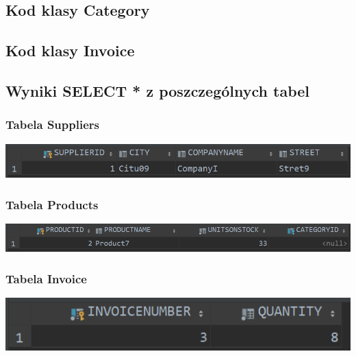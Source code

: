\documentclass[a4paper, 11pt]{article}
\begin{document}
    \newpage

    \subsection{Kod klasy Category}
    

    \newpage

    \subsection{Kod klasy Invoice}
    

    \newpage

    \subsection{Wyniki SELECT * z poszczególnych tabel}

    \subsubsection{Tabela Suppliers}
    \begin{center}
        \includegraphics{images/point7/SelectSuppliers.png}
    \end{center}

    \subsubsection{Tabela Products}
    \begin{center}
        \includegraphics[scale=0.85]{images/point7/SelectProducts.png}
    \end{center}

    \subsubsection{Tabela Invoice}
    \begin{center}
        \includegraphics{images/point7/SelectInvoice.png}
    \end{center}
\end{document}
